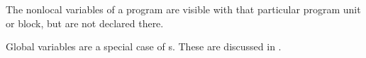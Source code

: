 \begin{definition}\label{def:Nonlocal_Variable}
  The nonlocal variables of a program are visible with that particular program unit or block, but are not declared there.

  \begin{remark}
    Global variables are a special case of s.
    These are discussed in .
  \end{remark}
\end{definition}

